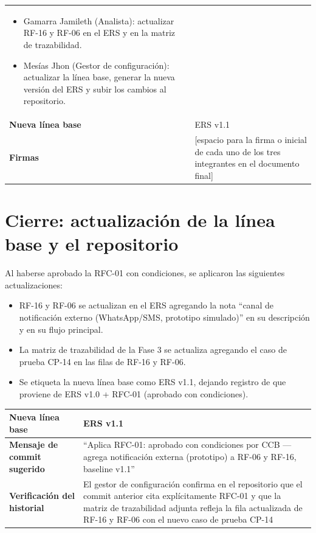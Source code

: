 \documentclass[12pt,a4paper]{article}
\begin{document}
\begin{table}[H]
\begin{tabular}{@{}p{4cm}p{10cm}@{}}
\begin{itemize}[leftmargin=*,nosep]
    \item Gamarra Jamileth (Analista): actualizar RF-16 y RF-06 en el ERS y en la matriz de trazabilidad.
    \item Mesías Jhon (Gestor de configuración): actualizar la línea base, generar la nueva versión del ERS y subir los cambios al repositorio.
\end{itemize} \\
\textbf{Nueva línea base} & ERS v1.1 \\
\textbf{Firmas} & [espacio para la firma o inicial de cada uno de los tres integrantes en el documento final] \\
\bottomrule
\end{tabular}
\end{table}

\section{ Cierre: actualización de la línea base y el repositorio }

Al haberse aprobado la RFC-01 con condiciones, se aplicaron las siguientes actualizaciones:

\begin{itemize}[leftmargin=*]
    \item RF-16 y RF-06 se actualizan en el ERS agregando la nota ``canal de notificación externo (WhatsApp/SMS, prototipo simulado)'' en su descripción y en su flujo principal.
    \item La matriz de trazabilidad de la Fase 3 se actualiza agregando el caso de prueba CP-14 en las filas de RF-16 y RF-06.
    \item Se etiqueta la nueva línea base como ERS v1.1, dejando registro de que proviene de ERS v1.0 + RFC-01 (aprobado con condiciones).
\end{itemize}

\begin{table}[H]
\centering
\begin{tabular}{@{}ll@{}}
\toprule
\textbf{Nueva línea base} & ERS v1.1 \\
\midrule
\textbf{Mensaje de commit sugerido} & ``Aplica RFC-01: aprobado con condiciones por CCB --- agrega notificación externa (prototipo) a RF-06 y RF-16, baseline v1.1'' \\
\textbf{Verificación del historial} & El gestor de configuración confirma en el repositorio que el commit anterior cita explícitamente RFC-01 y que la matriz de trazabilidad adjunta refleja la fila actualizada de RF-16 y RF-06 con el nuevo caso de prueba CP-14 \\
\bottomrule
\end{tabular}
\end{table}
\end{document}

